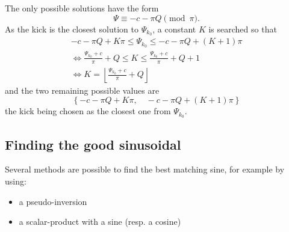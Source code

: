 The only possible solutions have the form
\begin{equation}
 \Psi \equiv - c - \pi Q \pmod \pi.
\end{equation}
As the kick is the closest solution to $\Psi_{k_0}$, a constant $K$ is searched so that
\begin{gather}
 -c - \pi Q + K \pi  \leq \Psi_{k_0} \leq -c -\pi Q + (K+1) \pi \nonumber \\
\iff \frac{\Psi_{k_0} + c}{\pi} + Q \leq K \leq \frac{\Psi_{k_0} + c}{\pi} + Q + 1 \nonumber \\
\iff K = \left\lfloor  \frac{\Psi_{k_0}+c}{\pi} + Q \right\rfloor 
\end{gather}
and the two remaining possible values are
\begin{equation}
\left\lbrace - c - \pi Q+ K \pi , \quad - c - \pi Q + (K+1) \pi\right\rbrace
\end{equation}
the kick being chosen as the closest one from $\Psi_{k_0}$.

\subsection{Finding the good sinusoidal}
Several methods are possible to find the best matching sine, for example by using:
\begin{itemize}
	\item a pseudo-inversion
	\item a scalar-product with a sine (resp. a cosine)
\end{itemize}

